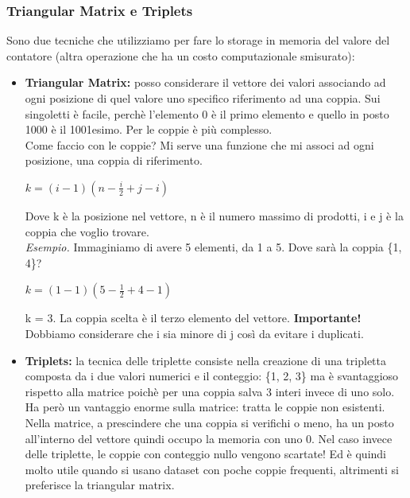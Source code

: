 \subsubsection{Triangular Matrix e Triplets}
Sono due tecniche che utilizziamo per fare lo storage in memoria del valore del contatore (altra operazione che ha un costo computazionale smisurato):
\begin{itemize}
    \item \textbf{Triangular Matrix:} posso considerare il vettore dei valori associando ad ogni posizione di quel valore uno specifico riferimento ad una coppia. Sui singoletti è facile, perchè l'elemento 0 è il primo elemento e quello in posto 1000 è il 1001esimo. Per le coppie è più complesso. 
    \\ 
    Come faccio con le coppie? Mi serve una funzione che mi associ ad ogni posizione, una coppia di riferimento. 
    \begin{center}
        \begin{math}
            k = (i-1)(n-\frac{i}{2} + j - i)
        \end{math}
    \end{center}
    Dove k è la posizione nel vettore, n è il numero massimo di prodotti, i e j è la coppia che voglio trovare. 
    \\
    \textit{Esempio.} Immaginiamo di avere 5 elementi, da 1 a 5. Dove sarà la coppia \{1, 4\}? 
    \begin{center}
        \begin{math}
            k = (1-1)(5-\frac{1}{2} + 4 - 1)
        \end{math}
    \end{center}
    k = 3. La coppia scelta è il terzo elemento del vettore. \textbf{Importante!} Dobbiamo considerare che i sia minore di j così da evitare i duplicati.
    \item \textbf{Triplets:} la tecnica delle triplette consiste nella creazione di una tripletta composta da i due valori numerici e il conteggio: \{1, 2, 3\} ma è svantaggioso rispetto alla matrice poichè per una coppia salva 3 interi invece di uno solo. Ha però un vantaggio enorme sulla matrice: tratta le coppie non esistenti. Nella matrice, a prescindere che una coppia si verifichi o meno, ha un posto all'interno del vettore quindi occupo la memoria con uno 0. Nel caso invece delle triplette, le coppie con conteggio nullo vengono scartate! Ed è quindi molto utile quando si usano dataset con poche coppie frequenti, altrimenti si preferisce la triangular matrix.
\end{itemize} 

